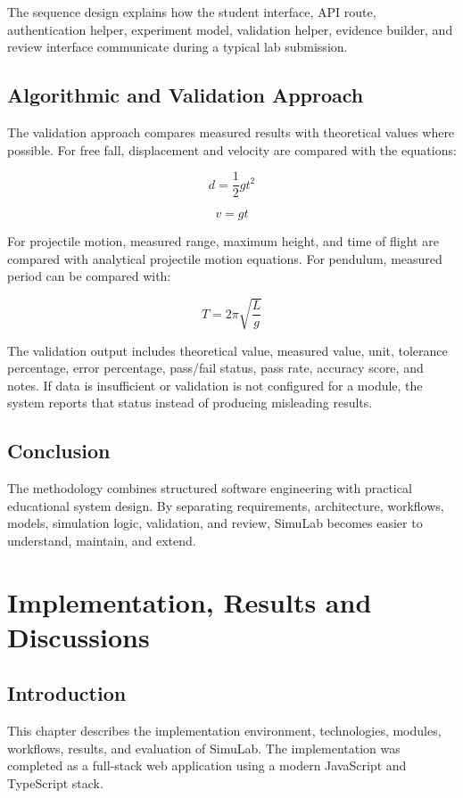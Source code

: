 \documentclass[12pt,a4paper]{report}
\begin{document}
The sequence design explains how the student interface, API route, authentication helper, experiment model, validation helper, evidence builder, and review interface communicate during a typical lab submission.

\section{Algorithmic and Validation Approach}
The validation approach compares measured results with theoretical values where possible. For free fall, displacement and velocity are compared with the equations:

\[
d = \frac{1}{2}gt^2
\]

\[
v = gt
\]

For projectile motion, measured range, maximum height, and time of flight are compared with analytical projectile motion equations. For pendulum, measured period can be compared with:

\[
T = 2\pi \sqrt{\frac{L}{g}}
\]

The validation output includes theoretical value, measured value, unit, tolerance percentage, error percentage, pass/fail status, pass rate, accuracy score, and notes. If data is insufficient or validation is not configured for a module, the system reports that status instead of producing misleading results.

\section{Conclusion}
The methodology combines structured software engineering with practical educational system design. By separating requirements, architecture, workflows, models, simulation logic, validation, and review, SimuLab becomes easier to understand, maintain, and extend.

\chapter{Implementation, Results and Discussions}

\section{Introduction}
This chapter describes the implementation environment, technologies, modules, workflows, results, and evaluation of SimuLab. The implementation was completed as a full-stack web application using a modern JavaScript and TypeScript stack.
\end{document}
